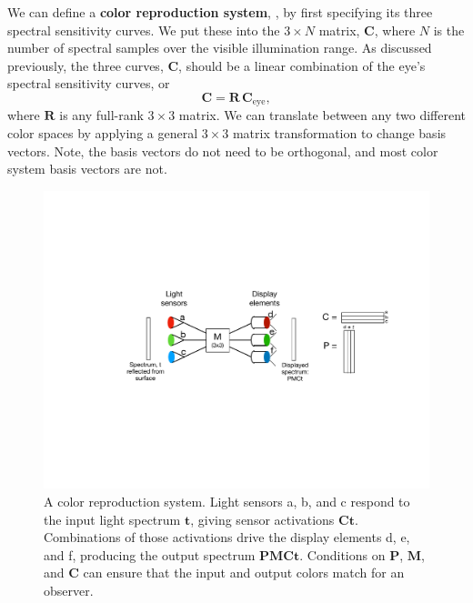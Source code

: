 We can define a {\bf color reproduction system}, \fig{\ref{fig:colorsystem}}, by first specifying its  three spectral sensitivity curves.  We put these into the $3 \times N$ matrix, $\mathbf{C}$, where $N$ is the number of spectral samples over the visible illumination range.  As discussed previously, the three curves, $\mathbf{C}$, should be a linear combination of the eye's spectral sensitivity curves, or
\begin{equation}
    \mathbf{C} = \mathbf{R} \, \mathbf{C}_{\mbox{eye}},
    \label{eq:match2}
\end{equation}
where $\mathbf{R}$ is any full-rank $3 \times 3$ matrix. We can translate between any two different color
spaces by  applying a general $3 \times 3$ matrix transformation
to change basis vectors.  Note, the basis vectors do not need to be
orthogonal, and  most color system basis vectors are not.


\begin{figure}[t]
\centerline{
\includegraphics[width=1.0\linewidth]{figures/color/colorRepro2.pdf}
}
\caption{A color reproduction system.  Light sensors a, b, and c respond to the input light spectrum $\mathbf{t}$, giving sensor activations $\mathbf{C} \mathbf{t}$.  Combinations of those activations drive the display elements d, e, and f, producing the output spectrum $\mathbf{P}\mathbf{M} \mathbf{C} \mathbf{t}$. Conditions on $\mathbf{P}$, $\mathbf{M}$, and $\mathbf{C}$ can ensure that the input and output colors match for an observer.}
\label{fig:colorsystem}
\end{figure}


